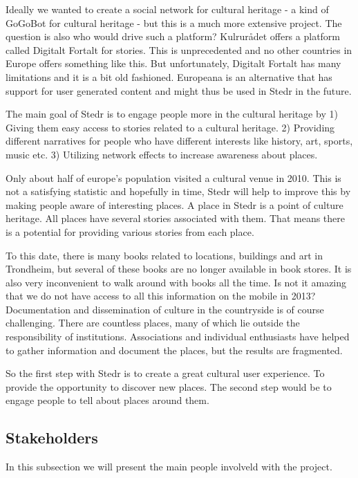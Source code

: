 Ideally we wanted to create a social network for cultural heritage - a kind of GoGoBot for cultural heritage - but this is a much more extensive project. The question is also who would drive such a platform? Kulrurådet offers a platform called Digitalt Fortalt for stories. This is unprecedented and no other countries in Europe offers something like this. But unfortunately, Digitalt Fortalt has many limitations and it is a bit old fashioned. Europeana is an alternative that has support for user generated content and might thus be used in Stedr in the future.

The main goal of Stedr is to engage people more in the cultural heritage by 1) Giving them easy access to stories related to a cultural heritage. 2) Providing different narratives for people who have different interests like history, art, sports, music etc. 3) Utilizing network effects to increase awareness about places.

Only about half of europe's population visited a cultural venue in 2010. This is not a satisfying statistic and hopefully in time, Stedr will help to improve this by making people aware of interesting places. A place in Stedr is a point of culture heritage. All places have several stories associated with them. That means there is a potential for providing various stories from each place.

To this date, there is many books related to locations, buildings and art in Trondheim, but several of these books are no longer available in book stores. It is also very inconvenient to walk around with books all the time. Is not it amazing that we do not have access to all this information on the mobile in 2013? Documentation and dissemination of culture in the countryside is of course challenging. There are countless places, many of which lie outside the responsibility of institutions. Associations and individual enthusiasts have helped to gather information and document the places, but the results are fragmented.

So the first step with Stedr is to create a great cultural user experience. To provide the opportunity to discover new places. The second step would be to engage people to tell about places around them.


\subsection{Stakeholders}
In this subsection we will present the main people involveld with the project. 

